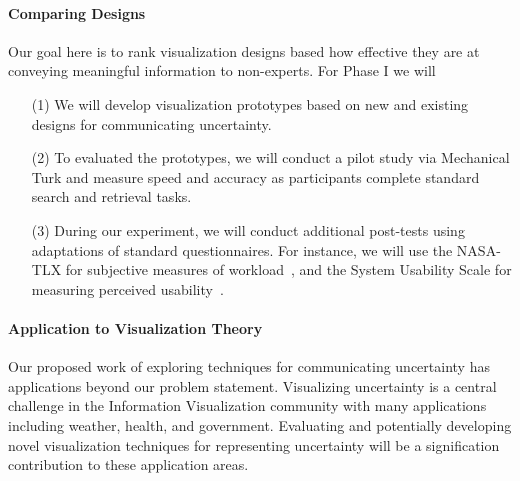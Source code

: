 \paragraph{Comparing Designs} 
Our goal here is to rank visualization designs based how effective they are at conveying meaningful information to non-experts.  
For Phase I we will 
\begin{itemize}
	
\item[(1)] We will develop visualization prototypes based on new and existing designs for communicating uncertainty. 
\item[(2)] To evaluated the prototypes, we will conduct a pilot study via Mechanical Turk and measure speed and accuracy as participants complete standard search and retrieval tasks.
\item[(3)] During our experiment, we will conduct additional post-tests using adaptations of standard questionnaires. For instance, we will use the NASA-TLX for subjective measures of workload~\cite{hart1988development}, and the System Usability Scale for measuring perceived usability~\cite{bangor2008empirical}. 
\end{itemize}


\paragraph{Application to Visualization Theory} 
Our proposed work of exploring techniques for communicating uncertainty has applications beyond our problem statement. Visualizing uncertainty is a central challenge in the Information Visualization community with many applications including weather, health, and government. Evaluating and potentially developing novel visualization techniques for representing uncertainty will be a signification contribution to these application areas.  


